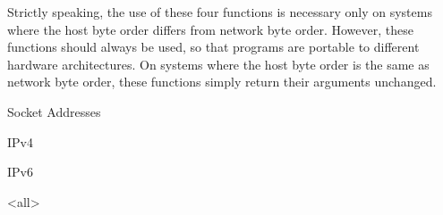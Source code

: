 Strictly speaking, the use of these four functions is necessary only on systems where the
host byte order differs from network byte order. However, these functions should always
be used, so that programs are portable to different hardware architectures. On systems
where the host byte order is the same as network byte order, these functions simply return
their arguments unchanged. 

\begin{frame}{Socket Addresses}
  \begin{iblock}{IPv4}
    \begin{center}
    \end{center}
  \end{iblock}
  \begin{iblock}{IPv6}
    \begin{center}
    \end{center}
  \end{iblock}
\end{frame}


\mode<all>
